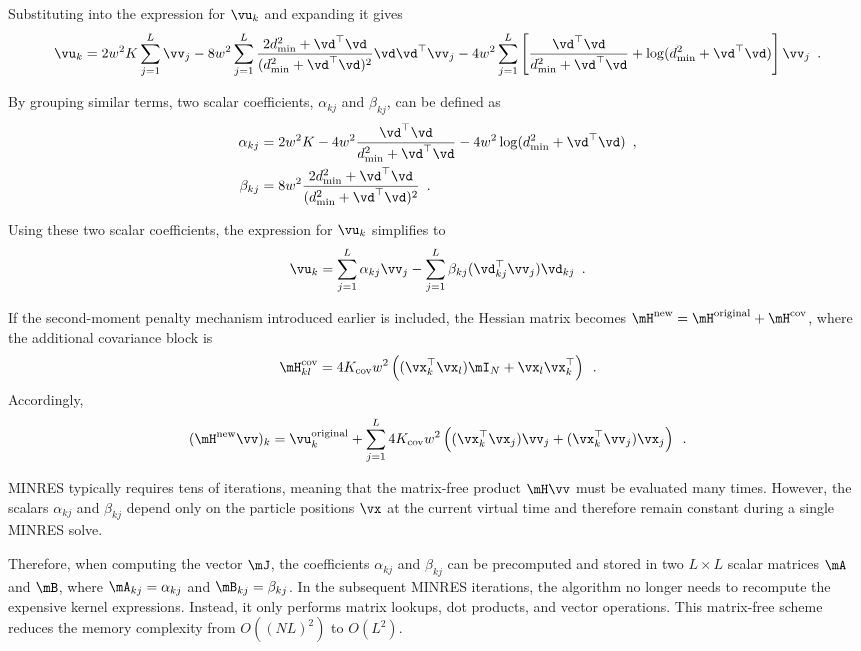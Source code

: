 Substituting  into the expression for $\vu_k$ and expanding it gives
\begin{equation}
	\vu_k = 2w^2 K \sum_{j=1}^L \vv_j - 8w^2 \sum_{j=1}^L \frac{2d_{\text{min}}^2 + \vd^{\top}\vd}{(d_{\text{min}}^2 + \vd^{\top}\vd)^2} \vd\vd^{\top} \vv_j - 4w^2 \sum_{j=1}^L \left[ \frac{\vd^{\top}\vd}{d_{\text{min}}^2 + \vd^{\top}\vd} + \log(d_{\text{min}}^2 + \vd^{\top}\vd) \right] \vv_j \enspace .
\end{equation}

By grouping similar terms, two scalar coefficients, $\alpha_{kj}$ and $\beta_{kj}$, can be defined as
\begin{align}
	\alpha_{kj} &= 2w^2 K - 4w^2 \frac{\vd^{\top}\vd}{d_{\text{min}}^2 + \vd^{\top}\vd} - 4w^2 \log(d_{\text{min}}^2 + \vd^{\top}\vd) \enspace , \\
	\beta_{kj} &= 8w^2 \frac{2d_{\text{min}}^2 + \vd^{\top}\vd}{(d_{\text{min}}^2 + \vd^{\top}\vd)^2} \enspace .
\end{align}

Using these two scalar coefficients, the expression for $\vu_k$ simplifies to
\begin{equation}
	\vu_k = \sum_{j=1}^L \alpha_{kj} \vv_j - \sum_{j=1}^L \beta_{kj} (\vd_{kj}^{\top} \vv_j) \vd_{kj} \enspace .
\end{equation}

If the second-moment penalty mechanism introduced earlier is included, the Hessian matrix becomes $\mH^{\mathrm{new}} = \mH^{\mathrm{original}} + \mH^{\mathrm{cov}}$, where the additional covariance block is
\begin{equation}
	\mH_{kl}^{\mathrm{cov}} = 4K_{\mathrm{cov}}w^2 \left( (\vx_k^{\top} \vx_l)\mI_N + \vx_l \vx_k^{\top} \right) \enspace .
\end{equation}
Accordingly,
\begin{equation}
	(\mH^{\mathrm{new}}\vv)_k = \vu_k^{\mathrm{original}} + \sum_{j=1}^L 4K_{\mathrm{cov}}w^2 \left( (\vx_k^{\top} \vx_j)\vv_j + (\vx_k^{\top} \vv_j)\vx_j \right) \enspace .
\end{equation}

MINRES typically requires tens of iterations, meaning that the matrix-free product $\mH\vv$ must be evaluated many times. However, the scalars $\alpha_{kj}$ and $\beta_{kj}$ depend only on the particle positions $\vx$ at the current virtual time and therefore remain constant during a single MINRES solve.

Therefore, when computing the vector $\mJ$, the coefficients $\alpha_{kj}$ and $\beta_{kj}$ can be precomputed and stored in two $L \times L$ scalar matrices $\mA$ and $\mB$, where $\mA_{kj} = \alpha_{kj}$ and $\mB_{kj} = \beta_{kj}$. In the subsequent MINRES iterations, the algorithm no longer needs to recompute the expensive kernel expressions. Instead, it only performs matrix lookups, dot products, and vector operations. This matrix-free scheme reduces the memory complexity from $O((NL)^2)$ to $O(L^2)$.

